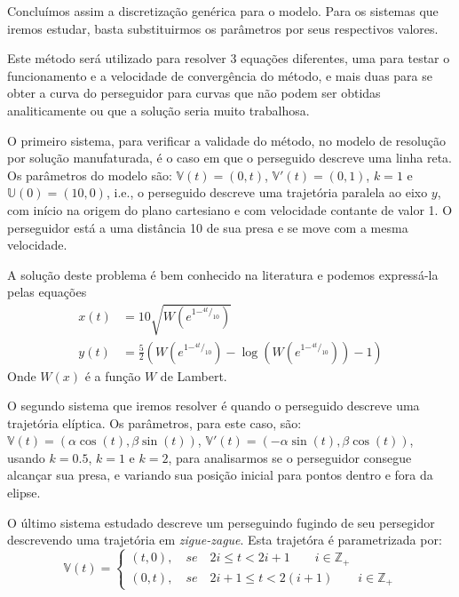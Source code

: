 \documentclass[a4paper,10pt]{article}
\begin{document}
  Concluímos assim a discretização genérica para o modelo. Para os sistemas que iremos estudar, basta substituirmos os parâmetros por seus respectivos valores.
  
  Este método será utilizado para resolver 3 equações diferentes, uma para testar o funcionamento e a velocidade de convergência do método, e mais duas para se obter a curva do perseguidor para curvas que não podem ser obtidas analiticamente ou que a solução seria muito trabalhosa. 
  
  O primeiro sistema, para verificar a validade do método, no modelo de resolução por solução manufaturada, é o caso em que o perseguido descreve uma linha reta. Os parâmetros do modelo são: $\mathbb{V}(t) = (0, t)$, $\mathbb{V}'(t) = (0, 1)$, $k = 1$ e $\mathbb{U}(0) = (10, 0)$, i.e., o perseguido descreve uma trajetória paralela ao eixo $y$, com início na origem do plano cartesiano e com velocidade contante de valor 1. O perseguidor está a uma distância 10 de sua presa e se move com a mesma velocidade.
  
  A solução deste problema é bem conhecido na literatura\cite{wolfram} e podemos expressá-la pelas equações
  \begin{align}
   x(t) &= 10\sqrt{W(e^{1 -^{4t}/_{10}})} \\
   y(t) &= \frac{5}{2}(W(e^{1 -^{4t}/_{10}}) - \log{(W(e^{1 -^{4t}/_{10}}))} - 1)   
  \end{align}
  Onde $W(x)$ é a função $W$ de Lambert.
  
  O segundo sistema que iremos resolver é quando o perseguido descreve uma trajetória elíptica. Os parâmetros, para este caso, são: $\mathbb{V}(t) = (\alpha \cos(t), \beta \sin(t))$, $\mathbb{V}'(t) = (-\alpha \sin(t), \beta \cos(t))$, usando $k = 0.5$, $k = 1$ e $k = 2$, para analisarmos se o perseguidor consegue alcançar sua presa, e variando sua posição inicial para pontos dentro e fora da elipse.
  
  O último sistema estudado descreve um perseguindo fugindo de seu persegidor descrevendo uma trajetória em \emph{zigue-zague}. Esta trajetóra é parametrizada por:
  \begin{equation}
  \mathbb{V}(t) =
   \begin{cases}
    (t, 0), \quad se \quad 2i \leqslant t < 2i + 1 \qquad i \in \mathbb{Z_{+}} \\
    (0, t), \quad se \quad 2i + 1 \leqslant t < 2(i + 1) \qquad i \in \mathbb{Z_{+}}
   \end{cases}
   \label{eq:param}
  \end{equation}
  
\end{document}

